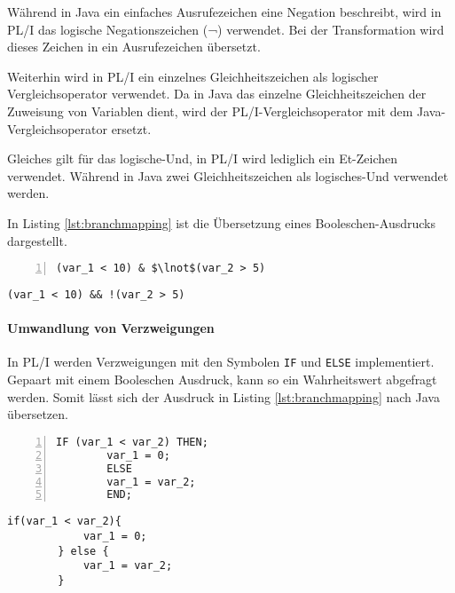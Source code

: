 Während in Java ein einfaches Ausrufezeichen eine Negation beschreibt, wird in PL/I das logische Negationszeichen (¬) verwendet. Bei der Transformation wird dieses Zeichen in ein Ausrufezeichen übersetzt.

Weiterhin wird in PL/I ein einzelnes Gleichheitszeichen als logischer Vergleichsoperator verwendet. Da in Java das einzelne Gleichheitszeichen der Zuweisung von Variablen dient, wird der PL/I-Vergleichsoperator mit dem Java-Vergleichsoperator ersetzt.

Gleiches gilt für das logische-Und, in PL/I wird lediglich ein Et-Zeichen verwendet. Während in Java zwei Gleichheitszeichen als logisches-Und verwendet werden.

In Listing \ref{lst:branchmapping} ist die Übersetzung eines Booleschen-Ausdrucks dargestellt.

\begin{minipage}[b]{0.48\linewidth}
	\centering
	\lstset{language=PL/I,label=SliceExaple}
	\begin{lstlisting}[frame=single, numbers=left, mathescape,%
		caption={Boolescher-Ausdruck}, label={lst:branchmapping}]	
		(var_1 < 10) & $\lnot$(var_2 > 5)
	\end{lstlisting}
\end{minipage}
\hspace{0.5cm}
\begin{minipage}[b]{0.48\linewidth}
	\centering
	\lstset{language=Java,label=SliceExaple}
	\begin{lstlisting}[frame=single, mathescape,%
		title={" "}]
		(var_1 < 10) && !(var_2 > 5)
	\end{lstlisting}
\end{minipage}
\pagebreak

\paragraph*{Umwandlung von Verzweigungen}

In PL/I werden Verzweigungen mit den Symbolen \verb+IF+ und \verb+ELSE+ implementiert. 
Gepaart mit einem Booleschen Ausdruck, kann so ein Wahrheitswert abgefragt werden.
Somit lässt sich der Ausdruck in Listing \ref{lst:branchmapping} nach Java übersetzen.

\begin{minipage}[b]{0.48\linewidth}
	\centering
	\lstset{language=PL/I,label=SliceExaple}
	\begin{lstlisting}[frame=single, numbers=left, mathescape,%
		caption={Transformation Verzweigungen}, label={lst:branchmapping}]	
		IF (var_1 < var_2) THEN;
		var_1 = 0;
		ELSE
		var_1 = var_2;
		END;
	\end{lstlisting}
\end{minipage}
\hspace{0.5cm}
\begin{minipage}[b]{0.48\linewidth}
	\centering
	\lstset{language=Java,label=SliceExaple}
	\begin{lstlisting}[frame=single, mathescape,%
		title={" "}]
		if(var_1 < var_2){
			var_1 = 0;	
		} else {
			var_1 = var_2;
		}
	\end{lstlisting}
\end{minipage} 

